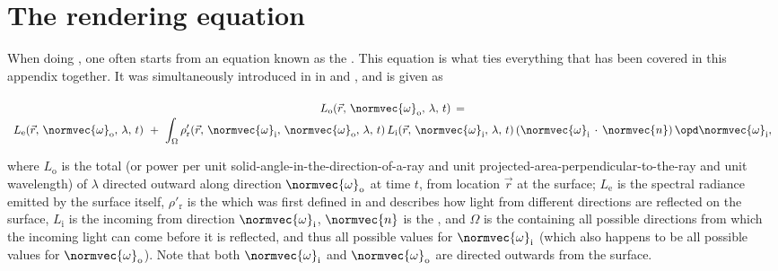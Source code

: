 \section{The rendering equation}

When doing , one often starts from an equation known as the . This equation is what ties everything that has been covered in this appendix together. It was simultaneously introduced in  in \citep{temp} and \citep{temp}, and is given as

\begin{equation} \label{eq:rendering_equation_original}
\renewcommand*{\arraystretch}{1.5}
\begin{array}{c}
L_{\text{o}}(\vec{r},\,\normvec{\omega}_{\text{o}},\, \lambda,\, t) \,= \\
\displaystyle L_{\text{e}}(\vec{r},\, \normvec{\omega}_{\text{o}},\, \lambda,\, t) \ + \ \int_\Omega \rho'_{\text{r}}(\vec{r},\, \normvec{\omega}_{\text{i}},\, \normvec{\omega}_{\text{o}},\, \lambda,\, t)\, L_{\text{i}}(\vec{r},\, \normvec{\omega}_{\text{i}},\, \lambda,\, t)\, (\normvec{\omega}_{\text{i}}\,\cdot\,\normvec{n})\, \opd \normvec{\omega}_{\text{i}},
\end{array}
\end{equation}

where $L_{\text{o}}$ is the total  (or power per unit solid-angle-in-the-direction-of-a-ray and unit projected-area-perpendicular-to-the-ray and unit wavelength) of  $\lambda$ directed outward along direction $\normvec{\omega}_{\text{o}}$ at time $t$, from location $\vec{r}$ at the surface; $L_{\text{e}}$ is the spectral radiance emitted by the surface itself, $\rho'_{\text{r}}$ is the \BRDF which was first defined in \citep{temp} and describes how light from different directions are reflected on the surface, $L_{\text{i}}$ is the  incoming from direction $\normvec{\omega}_{\text{i}}$, $\normvec{n}$ is the , and $\Omega$ is the  containing all possible directions from which the incoming light can come before it is reflected, and thus all possible values for $\normvec{\omega}_{\text{i}}$ (which also happens to be all possible values for $\normvec{\omega}_{\text{o}}$). Note that both $\normvec{\omega}_{\text{i}}$ and $\normvec{\omega}_{\text{o}}$ are directed outwards from the surface.

